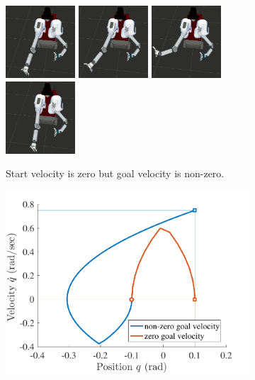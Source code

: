 \documentclass[letterpaper, 10 pt, conference]{ieeeconf}  %
\begin{document}
\begin{figure}[t!]
\begin{minipage}[t]{0.64\linewidth}
\begin{subfigure}[b]{\textwidth}
		\label{fig:motivation:slow}
	\end{subfigure}
	\begin{subfigure}[b]{\textwidth}
		\centering
		\includegraphics[height=2.7cm]{fig/motivation/fast1}
		\includegraphics[height=2.7cm]{fig/motivation/fast2}
		\includegraphics[height=2.7cm]{fig/motivation/fast3}
		\includegraphics[height=2.7cm]{fig/motivation/fast4}
		\caption{Start velocity is zero but goal velocity is non-zero.}
		\label{fig:motivation:fast}
	\end{subfigure}
    \end{minipage}
    \begin{minipage}[t]{0.35\linewidth}
    	\begin{subfigure}[c]{\textwidth}
    		\includegraphics[width=\textwidth]{fig/motivation/phase_plot}

\end{subfigure}
\end{minipage}
\end{figure}
\end{document}
